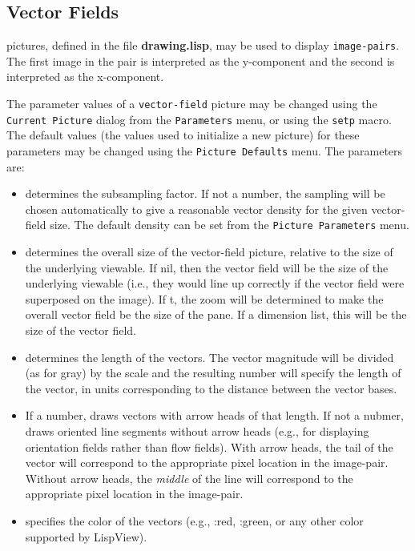 \subsection{Vector Fields}
\label{sec:vector-field}

 pictures, defined in the file {\bf
drawing.lisp}, may be used to display {\tt image-pairs}.  The first
image in the pair is interpreted as the y-component and the second is
interpreted as the x-component.

The parameter values of a {\tt vector-field} picture may be changed
using the {\tt Current Picture} dialog from the {\tt Parameters} menu,
or using the {\tt setp} macro.  The default values (the values used to
initialize a new picture) for these parameters may be changed using
the {\tt Picture Defaults} menu.  The parameters are:
\begin{itemize}
\item {} determines the subsampling factor.  If not a number, the
sampling will be chosen automatically to give a reasonable vector
density for the given vector-field size.  The default density can be set
from the {\tt Picture Parameters} menu.

\item {} determines the overall size of the vector-field
picture, relative to the size of the underlying viewable.  If nil,
then the vector field will be the size of the underlying viewable
(i.e., they would line up correctly if the vector field were superposed
on the image).  If t, the zoom will be determined to make the overall
vector field be the size of the pane.  If a dimension list, this will
be the size of the vector field.  

\item {} determines the length of the vectors.  The vector
magnitude will be divided (as for gray) by the scale and the resulting
number will specify the length of the vector, in units corresponding
to the distance between the vector bases.

\item {} If a number, draws vectors with arrow heads of
that length.  If not a nubmer, draws oriented line segments without
arrow heads (e.g., for displaying orientation fields rather than flow
fields).  With arrow heads, the tail of the vector will correspond to
the appropriate pixel location in the image-pair.  Without arrow
heads, the {\em middle} of the line will correspond to the appropriate
pixel location in the image-pair.

\item {} specifies the color of the vectors (e.g., :red,
:green, or any other color supported by LispView).
\end{itemize}


